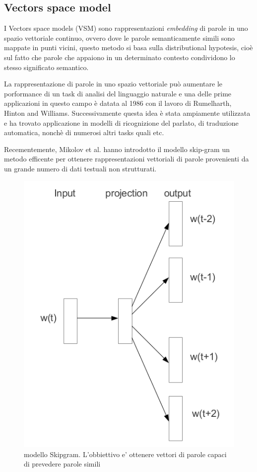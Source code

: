 \documentclass[a4paper,12pt,openright,twoside]{report}
\theoremstyle{definition}
\begin{document}
\subsection{Vectors space model}
I Vectors space models (VSM) sono rappresentazioni \emph{embedding} di parole in uno spazio vettoriale 
continuo, ovvero dove le parole
semanticamente simili sono mappate in punti vicini, questo metodo si basa sulla distributional hypotesis, 
cioè sul fatto che parole che appaiono in 
un determinato contesto condividono lo stesso significato semantico.

La rappresentazione di parole in uno spazio vettoriale può aumentare le porformance
di un task di analisi del linguaggio naturale e una delle prime
applicazioni in questo campo è datata al 1986 con il lavoro di Rumelharth, Hinton and Williams. Successivamente
questa idea è stata ampiamente utilizzata e ha trovato applicazione in modelli di ricognizione del parlato,
di traduzione automatica, nonchè di numerosi altri tasks quali etc.

Recementemente, Mikolov et al. hanno introdotto il modello skip-gram 
un metodo efficente per ottenere
rappresentazioni vettoriali di parole provenienti da un grande numero di dati testuali non strutturati.

\begin{figure}[h]
	\centering
	\includegraphics{Immagini/skipgram.png}
	\caption{modello Skipgram. L'obbiettivo e' ottenere vettori di parole capaci di prevedere
	parole simili}
	\label{fig:skipgram}
\end{figure}
\end{document}
